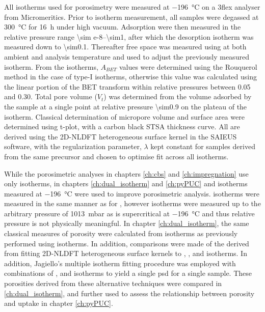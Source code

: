 All  isotherms used for porosimetry were measured at \qty{-196}{\degreeCelsius} on a 3flex analyser from Micromeritics. Prior to isotherm measurement, all samples were degassed at \qty{300}{\degreeCelsius} for \qty{16}{\hour} under high vacuum. Adsorption were then measured in the relative pressure range \numrange{\sim e-8}{\sim1}, after which the desorption isotherm was measured down to \num{\sim0.1}. Thereafter free space was measured using  at both ambient and analysis temperature and used to adjust the previously measured isotherm. From the isotherms, $A_{BET}$ values were determined using the Rouquerol method in the case of type-I isotherms,\citep{Rouquerol2007Is} otherwise this value was calculated using the linear portion of the BET transform within relative pressures between 0.05 and 0.30. Total pore volume ($V_t$) was determined from the volume adsorbed by the sample at a single point at relative pressure \num{\sim0.9} on the plateau of the isotherm. Classical determination of \gls{micropore} volume and surface area were determined using t-plot, with a carbon black STSA thickness curve. All  are derived using the 2D-NLDFT heterogeneous surface kernel in the SAIEUS software,\citep{Jagiello20132D} with the regularization parameter, $\lambda$\citep{Hansen1992Analysis, Hansen2001L} kept constant for samples derived from the same precursor and chosen to optimise fit across all isotherms. 

While the porosimetric analyses in chapters \ref{ch:cbs} and \ref{ch:impregnation} use only  isotherms, in chapters \ref{ch:dual_isotherm} and \ref{ch:pyPUC}   and  isotherms measured at \qty{-196}{\degreeCelsius} were used to improve porosimetric analysis.  isotherms were measured in the same manner as for , however  isotherms were measured up to  the arbitrary pressure of \qty{1013}{\milli\bar} as  is supercritical at \qty{-196}{\degreeCelsius} and thus relative pressure is not physically meaningful. In chapter \ref{ch:dual_isotherm}, the same classical measures of porosity were calculated from  isotherms as previously performed using  isotherms. In addition, comparisons were made of the  derived from fitting 2D-NLDFT heterogeneous surface kernels to , , and  isotherms. In addition, Jagiello's multiple isotherm fitting procedure\citep{Jagiello2015Dual} was employed with combinations of ,  and  isotherms to yield a single \acrshort{psd} for a single sample. These porosities derived from these alternative techniques were compared in \ref{ch:dual_isotherm}, and further used to assess the relationship between porosity and  uptake in chapter \ref{ch:pyPUC}.

